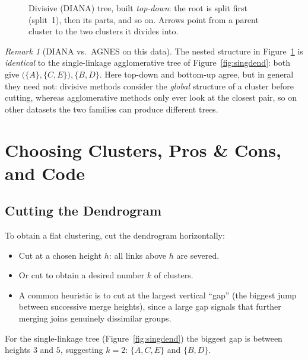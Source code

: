 \documentclass[11pt,a4paper]{report}
\theoremstyle{definition}
\theoremstyle{plain}
\theoremstyle{remark}
\newtheorem*{remark}{Remark}
\begin{document}
\begin{figure}[ht]
\centering
{}
\caption{Divisive (DIANA) tree, built \emph{top-down}: the root is split first
(split~1), then its parts, and so on. Arrows point from a parent cluster to the
two clusters it divides into.}
\label{fig:dianatree}
\end{figure}

\begin{remark}[DIANA vs.\ AGNES on this data]
The nested structure in Figure~\ref{fig:dianatree} is \emph{identical} to the
single-linkage agglomerative tree of Figure~\ref{fig:singdend}: both give
$\bigl(\{A\},\{C,E\}\bigr),\{B,D\}$. Here top-down and bottom-up agree, but in
general they need not: divisive methods consider the \emph{global} structure of
a cluster before cutting, whereas agglomerative methods only ever look at the
closest pair, so on other datasets the two families can produce different trees.
\end{remark}

\chapter{Choosing Clusters, Pros \& Cons, and Code}

\section{Cutting the Dendrogram}
To obtain a flat clustering, cut the dendrogram horizontally:
\begin{itemize}[nosep]
  \item Cut at a chosen height $h$: all links above $h$ are severed.
  \item Or cut to obtain a desired number $k$ of clusters.
  \item A common heuristic is to cut at the largest vertical ``gap''
        (the biggest jump between successive merge heights), since a large gap
        signals that further merging joins genuinely dissimilar groups.
\end{itemize}
For the single-linkage tree (Figure~\ref{fig:singdend}) the biggest gap is
between heights $3$ and $5$, suggesting $k=2$: $\{A,C,E\}$ and $\{B,D\}$.
\end{document}
